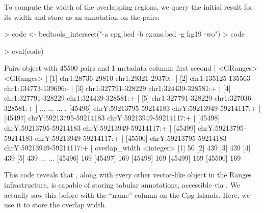 \documentclass[10pt]{article}
\begin{document}
To compute the width of the overlapping regions, we query the initial
result for its width and store as an annotation on the pairs:
\begin{Schunk}
\begin{Sinput}
> code <- bedtools_intersect("-a cpg.bed -b exons.bed -g hg19 -wo")
> code
\end{Sinput}
\begin{Sinput}
> eval(code)
\end{Sinput}
\begin{Soutput}
Pairs object with 45500 pairs and 1 metadata column:
                           first                   second |
                       <GRanges>                <GRanges> |
      [1]       chr1:28736-29810       chr1:29321-29370:- |
      [2]     chr1:135125-135563     chr1:134773-139696:- |
      [3]     chr1:327791-328229     chr1:324439-328581:+ |
      [4]     chr1:327791-328229     chr1:324439-328581:+ |
      [5]     chr1:327791-328229     chr1:327036-328581:+ |
      ...                    ...                      ... .
  [45496] chrY:59213795-59214183 chrY:59213949-59214117:+ |
  [45497] chrY:59213795-59214183 chrY:59213949-59214117:+ |
  [45498] chrY:59213795-59214183 chrY:59213949-59214117:+ |
  [45499] chrY:59213795-59214183 chrY:59213949-59214117:+ |
  [45500] chrY:59213795-59214183 chrY:59213949-59214117:+ |
          overlap_width
              <integer>
      [1]            50
      [2]           439
      [3]           439
      [4]           439
      [5]           439
      ...           ...
  [45496]           169
  [45497]           169
  [45498]           169
  [45499]           169
  [45500]           169
\end{Soutput}
\end{Schunk}

This code reveals that , along with every other
vector-like object in the Ranges infrastructure, is capable of storing
tabular annotations, accessible via . We actually saw
this before with the ``name'' column on the Cpg Islands. Here, we use
it to store the overlap width.
\end{document}
